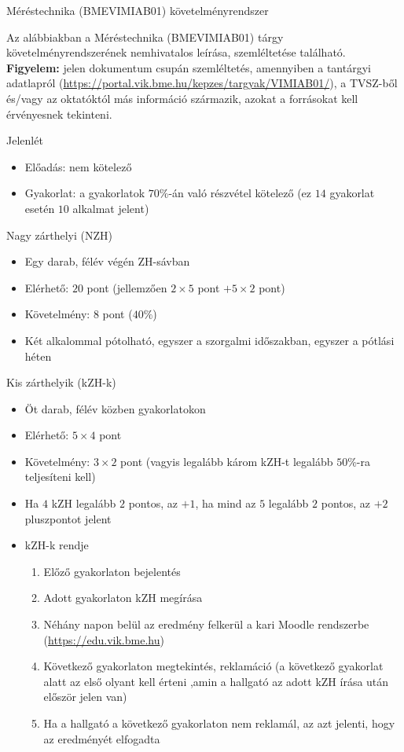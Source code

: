 \documentclass[a4paper,12pt]{article}
\begin{document}
	\begin{center}
		\LARGE Méréstechnika (BMEVIMIAB01) követelményrendszer
	\end{center}
	Az alábbiakban a Méréstechnika (BMEVIMIAB01) tárgy követelményrendszerének nemhivatalos leírása, szemléltetése található. \textbf{Figyelem:} jelen dokumentum csupán szemléltetés, amennyiben a tantárgyi adatlapról (\url{https://portal.vik.bme.hu/kepzes/targyak/VIMIAB01/}), a TVSZ-ből és/vagy az oktatóktól más információ származik, azokat a forrásokat kell érvényesnek tekinteni.
	
	Jelenlét
	\begin{itemize}
		\item Előadás: nem kötelező
		\item Gyakorlat: a gyakorlatok $70\%$-án való részvétel kötelező (ez $14$ gyakorlat esetén $10$ alkalmat jelent)
	\end{itemize}
	Nagy zárthelyi (NZH)
	\begin{itemize}
		\item Egy darab, félév végén ZH-sávban
		\item Elérhető: $20$ pont (jellemzően $2\times5$ pont $+5\times2$ pont)
		\item Követelmény: $8$ pont ($40\%$)
		\item Két alkalommal pótolható, egyszer a szorgalmi időszakban, egyszer a pótlási héten
	\end{itemize}
	Kis zárthelyik (kZH-k)
	\begin{itemize}
		\item Öt darab, félév közben gyakorlatokon
		\item Elérhető: $5\times4$ pont
		\item Követelmény: $3\times2$ pont (vagyis legalább károm kZH-t legalább $50\%$-ra teljesíteni kell)
		\item Ha $4$ kZH legalább $2$ pontos, az $+1$, ha mind az $5$ legalább $2$ pontos, az $+2$ pluszpontot jelent
		\item kZH-k rendje
		\begin{enumerate}
			\item Előző gyakorlaton bejelentés
			\item Adott gyakorlaton kZH megírása
			\item Néhány napon belül az eredmény felkerül a kari Moodle rendszerbe (\url{https://edu.vik.bme.hu})
			\item Következő gyakorlaton megtekintés, reklamáció (a következő gyakorlat alatt az első olyant kell érteni ,amin a hallgató az adott kZH írása után először jelen van)
			\item Ha a hallgató a következő gyakorlaton nem reklamál, az azt jelenti, hogy az eredményét elfogadta
		\end{enumerate}
	\end{itemize}
\end{document}

